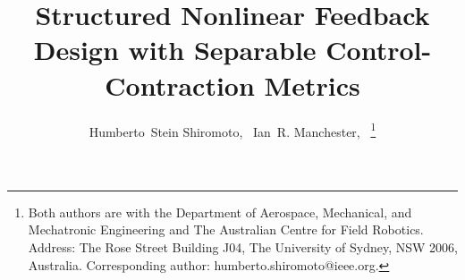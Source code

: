 \documentclass[10pt,twocolumn,twoside]{IEEEtran}
\theoremstyle{plain}
\theoremstyle{definition}
\theoremstyle{remark}
\begin{document}
%
\title{Structured Nonlinear Feedback Design with Separable Control-Contraction Metrics}
%
%
%

\author{Humberto~Stein Shiromoto,~
        Ian~R. Manchester,~%
\thanks{Both authors are with the Department of Aerospace, Mechanical, and Mechatronic Engineering and The Australian Centre for Field Robotics. Address: The
Rose Street Building J04, The University of Sydney, NSW 2006, Australia. Corresponding author: humberto.shiromoto@ieee.org.}%
}

% 
%



% 
\end{document}
